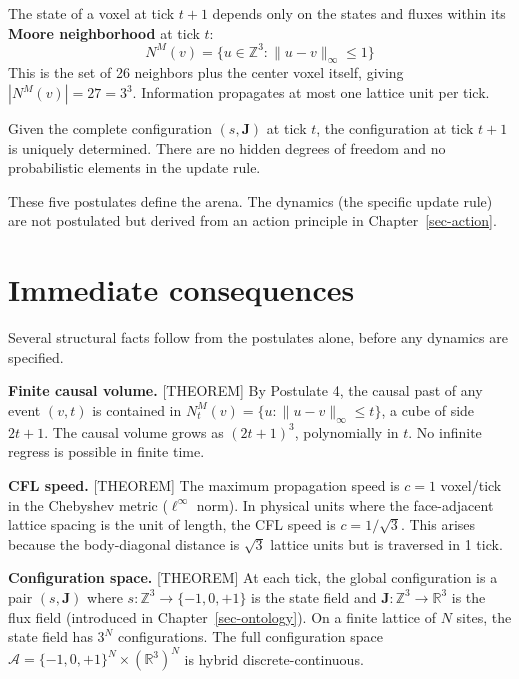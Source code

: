 \documentclass[
  11pt,
  letterpaper,
  twoside,
  openany]{book}
\makeatletter
\let\orig@section\section
\renewcommand{\section}{\needspace{8\baselineskip}\orig@section}
\makeatother
\begin{document}
\begin{ftdaxiom}

The state of a voxel at tick \(t+1\) depends only on the states and
fluxes within its \textbf{Moore neighborhood} at tick \(t\): \[
N^M(v) = \{ u \in \mathbb{Z}^3 : \|u - v\|_\infty \leq 1 \}
\] This is the set of 26 neighbors plus the center voxel itself, giving
\(|N^M(v)| = 27 = 3^3\). Information propagates at most one lattice unit
per tick.

\end{ftdaxiom}

\begin{ftdaxiom}

Given the complete configuration \((s, \mathbf{J})\) at tick \(t\), the
configuration at tick \(t+1\) is uniquely determined. There are no
hidden degrees of freedom and no probabilistic elements in the update
rule.

\end{ftdaxiom}

These five postulates define the arena. The dynamics (the specific
update rule) are not postulated but derived from an action principle in
Chapter~\ref{sec-action}.

\section{Immediate consequences}\label{immediate-consequences}

Several structural facts follow from the postulates alone, before any
dynamics are specified.

\textbf{Finite causal volume.} {[}THEOREM{]} By Postulate 4, the causal
past of any event \((v, t)\) is contained in
\(N^M_t(v) = \{ u : \|u - v\|_\infty \leq t \}\), a cube of side
\(2t + 1\). The causal volume grows as \((2t+1)^3\), polynomially in
\(t\). No infinite regress is possible in finite time.

\textbf{CFL speed.} {[}THEOREM{]} The maximum propagation speed is
\(c = 1\) voxel/tick in the Chebyshev metric (\(\ell^\infty\) norm). In
physical units where the face-adjacent lattice spacing is the unit of
length, the CFL speed is \(c = 1/\sqrt{3}\). This arises because the
body-diagonal distance is \(\sqrt{3}\) lattice units but is traversed in
1 tick.

\textbf{Configuration space.} {[}THEOREM{]} At each tick, the global
configuration is a pair \((s, \mathbf{J})\) where
\(s : \mathbb{Z}^3 \to \{-1, 0, +1\}\) is the state field and
\(\mathbf{J} : \mathbb{Z}^3 \to \mathbb{R}^3\) is the flux field
(introduced in Chapter~\ref{sec-ontology}). On a finite lattice of \(N\)
sites, the state field has \(3^N\) configurations. The full
configuration space
\(\mathcal{A} = \{-1, 0, +1\}^N \times (\mathbb{R}^3)^N\) is hybrid
discrete-continuous.
\end{document}
